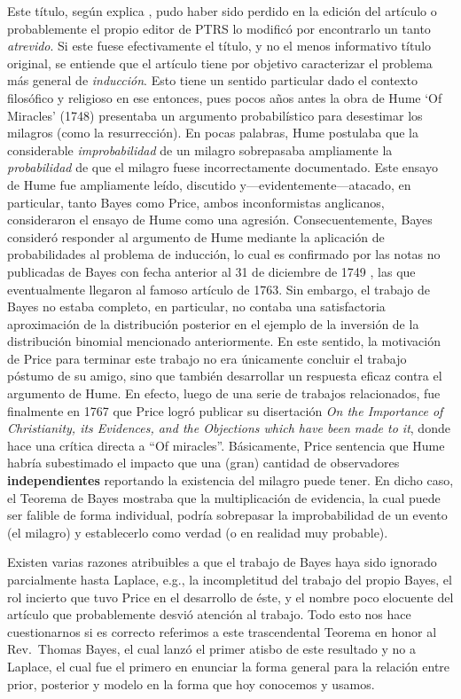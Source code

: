 Este título, según explica \cite{stigler2013}, pudo haber sido perdido en la edición del artículo o probablemente el propio editor de PTRS lo modificó por encontrarlo un tanto \emph{atrevido}.  Si este fuese efectivamente el título, y no el menos informativo título original, se entiende que el artículo tiene por objetivo caracterizar  el problema más general de \emph{inducción}. Esto tiene un sentido particular dado el contexto filosófico y religioso en ese entonces, pues pocos años antes la obra de Hume `Of Miracles' (1748) presentaba un argumento probabilístico para desestimar los milagros (como la resurrección). En  pocas  palabras, Hume postulaba que la considerable \emph{improbabilidad} de un milagro sobrepasaba ampliamente la \emph{probabilidad}  de  que el milagro fuese incorrectamente  documentado. Este ensayo de Hume fue ampliamente leído, discutido y---evidentemente---atacado, en particular, tanto Bayes como Price, ambos inconformistas anglicanos, consideraron  el ensayo de Hume como una agresión. Consecuentemente, Bayes consideró responder al argumento de  Hume mediante la aplicación de probabilidades al problema de inducción, lo cual es confirmado por las notas no publicadas de Bayes con fecha anterior al 31 de diciembre de 1749 \cite{bellhouse_2004}, las que eventualmente llegaron al famoso artículo de 1763. Sin embargo, el trabajo de Bayes no estaba completo, en particular, no contaba una satisfactoria aproximación de la distribución posterior en el ejemplo de la inversión de la distribución binomial mencionado anteriormente. En este sentido, la motivación de Price para terminar este trabajo no era únicamente concluir el trabajo póstumo de su amigo, sino que también desarrollar un respuesta eficaz contra el argumento de Hume. En efecto, luego de una serie de  trabajos relacionados, fue  finalmente en 1767 que Price logró publicar su disertación \emph{On the Importance of Christianity, its Evidences, and the Objections which have been made to it}, donde hace una crítica directa a “Of miracles”. Básicamente, Price sentencia que Hume habría subestimado el impacto que una (gran) cantidad de observadores \textbf{independientes} reportando la existencia del milagro puede tener. En dicho caso, el Teorema de Bayes mostraba que la multiplicación de evidencia, la cual puede ser falible de forma individual, podría sobrepasar la improbabilidad de un evento (el milagro) y establecerlo como verdad (o en realidad muy probable). 

Existen varias razones atribuibles a que el trabajo de Bayes haya sido ignorado parcialmente hasta Laplace, e.g., la incompletitud del trabajo del propio Bayes, el rol incierto que tuvo Price en el desarrollo de éste, y el nombre poco elocuente del artículo que probablemente desvió atención al trabajo. Todo esto nos hace cuestionarnos si es correcto referimos a este trascendental Teorema en honor al Rev.~Thomas Bayes, el cual lanzó el primer atisbo de este resultado y no a Laplace, el cual fue el primero en enunciar la forma general para la relación entre prior, posterior y modelo en la forma que hoy conocemos y usamos. 

